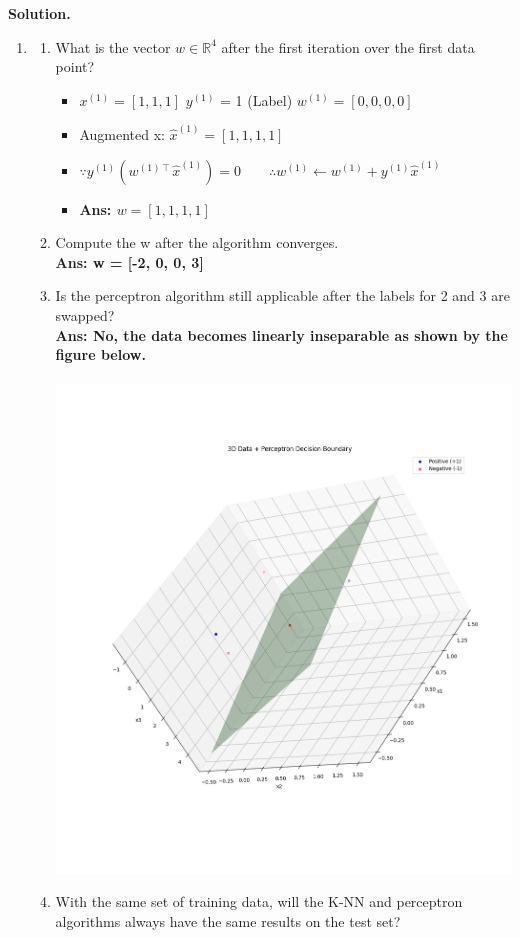 \documentclass{article}
\def\R{\mathbb{R}}
\theoremstyle{definition}
\theoremstyle{remark}
\begin{document}
\begin{enumerate}[font={\Large\bfseries},left=0pt]
\textbf{Solution.}
    \begin{tcolorbox}
    \begin{enumerate}
        \item \begin{enumerate}
            \item What is the vector $w \in \R^4$ after the first iteration over the first data point?
            \begin{itemize}
                \item $x^{(1)} = [1, 1, 1]$ \quad\quad $y^{(1)}$ = 1 (Label) \quad\quad $w^{(1)} = [0, 0, 0, 0]$
                \item Augmented x: $\hat{x}^{(1)} = [1, 1, 1, 1]$
                \item $\because y^{(1)}(w^{(1)\intercal}\hat{x}^{(1)}) = 0 \quad\quad \therefore w^{(1)} \leftarrow w^{(1)} + y^{(1)} \hat{x}^{(1)}$
                \item \textbf{Ans: $w = [1, 1, 1, 1]$}
            \end{itemize}
            \item Compute the w after the algorithm converges. \\
            \textbf{Ans: w = [-2, 0, 0, 3]}
            \item Is the perceptron algorithm still applicable after the labels for 2 and 3 are swapped? \\
            \textbf{Ans: No, the data becomes linearly inseparable as shown by the figure below.} \\\\
            \includegraphics[width=0.5\linewidth]{./perceptron_hyperplane.png}
            \item With the same set of training data, will the K-NN and perceptron algorithms always have the same results on the test set? \\

\end{enumerate}
\end{enumerate}
\end{tcolorbox}
\end{enumerate}
\end{document}
